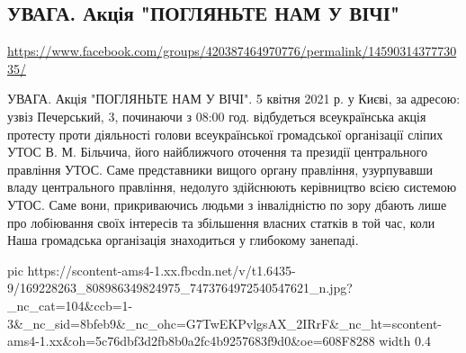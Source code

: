  
 
 
 
 

\subsection{УВАГА. Акція "ПОГЛЯНЬТЕ НАМ У ВІЧІ"}
\url{https://www.facebook.com/groups/420387464970776/permalink/1459031437773035/}

УВАГА. Акція "ПОГЛЯНЬТЕ НАМ У ВІЧІ". 5 квітня 2021 р. у Києві, за адресою: узвіз Печерський, 3, починаючи з 08:00 год. відбудеться всеукраїнська акція протесту проти діяльності голови всеукраїнської громадської організації сліпих УТОС В. М. Більчича, його найближчого оточення та президії центрального правління УТОС. Саме представники вищого органу правління, узурпувавши владу центрального правління, недолуго здійснюють керівництво всією системою УТОС. Саме вони, прикриваючись людьми з інвалідністю по зору дбають лише про лобіювання своїх інтересів та збільшення власних статків в той час, коли Наша громадська організація знаходиться у глибокому занепаді.


\ifcmt
  pic https://scontent-ams4-1.xx.fbcdn.net/v/t1.6435-9/169228263_808986349824975_7473764972540547621_n.jpg?_nc_cat=104&ccb=1-3&_nc_sid=8bfeb9&_nc_ohc=G7TwEKPvlgsAX_2IRrF&_nc_ht=scontent-ams4-1.xx&oh=5c76dbf3d2fb8b0a2fc4b9257683f9d0&oe=608F8288
  width 0.4
\fi


